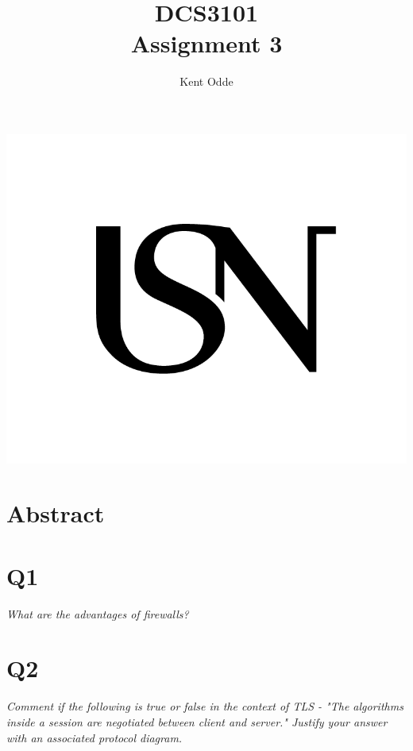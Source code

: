 \documentclass{article}
\begin{document}
\author{Kent Odde}
\title{DCS3101\\Assignment 3}

\maketitle
\thispagestyle{empty}
\begin{center}
\includegraphics[width=\linewidth,height=0.2\textheight,keepaspectratio]{img/USN.png}
\end{center}
\newpage

\tableofcontents

\newpage

\section{Abstract}

\section{Q1}
\begin{tcolorbox}\textit{What are the advantages of firewalls?}\end{tcolorbox}

\section{Q2}
\begin{tcolorbox}
  \textit{Comment if the following is true or false in the context of TLS - "The algorithms inside a session are negotiated between client and server." Justify your answer with an associated protocol diagram.}
\end{tcolorbox}
\end{document}
